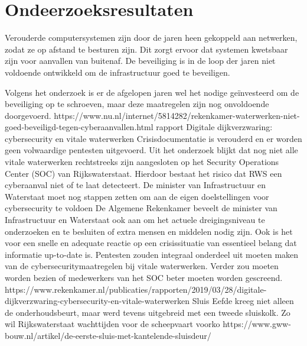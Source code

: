  







 









\chapter{Ondeerzoeksresultaten}



Verouderde computersystemen zijn door de jaren heen gekoppeld aan netwerken, zodat ze op afstand te besturen zijn. Dit zorgt ervoor dat systemen kwetsbaar zijn voor aanvallen van buitenaf. De beveiliging is in de loop der jaren niet voldoende ontwikkeld om de infrastructuur goed te beveiligen.

Volgens het onderzoek is er de afgelopen jaren wel het nodige geïnvesteerd om de beveiliging op te schroeven, maar deze maatregelen zijn nog onvoldoende doorgevoerd.
https://www.nu.nl/internet/5814282/rekenkamer-waterwerken-niet-goed-beveiligd-tegen-cyberaanvallen.html
rapport Digitale dijkverzwaring: cybersecurity en vitale waterwerken 
Crisisdocumentatie is verouderd en er worden geen volwaardige pentesten uitgevoerd. Uit het onderzoek blijkt dat nog niet alle vitale waterwerken rechtstreeks zijn aangesloten op het Security Operations Center (SOC) van Rijkswaterstaat. Hierdoor bestaat het risico dat RWS een cyberaanval niet of te laat detecteert. De minister van Infrastructuur en Waterstaat moet nog stappen zetten om aan de eigen doelstellingen voor cybersecurity te voldoen
De Algemene Rekenkamer beveelt de minister van Infrastructuur en Waterstaat ook aan om het actuele dreigingsniveau te onderzoeken en te besluiten of extra mensen en middelen nodig zijn. Ook is het voor een snelle en adequate reactie op een crisissituatie van essentieel belang dat informatie up-to-date is. Pentesten zouden integraal onderdeel uit moeten maken van de cybersecuritymaatregelen bij vitale waterwerken. Verder zou moeten worden bezien of medewerkers van het SOC beter moeten worden gescreend.
https://www.rekenkamer.nl/publicaties/rapporten/2019/03/28/digitale-dijkverzwaring-cybersecurity-en-vitale-waterwerken
Sluis Eefde kreeg niet alleen de onderhoudsbeurt, maar werd tevens uitgebreid met een tweede sluiskolk. Zo wil Rijkswaterstaat wachttijden voor de scheepvaart voorko
https://www.gww-bouw.nl/artikel/de-eerste-sluis-met-kantelende-sluisdeur/

